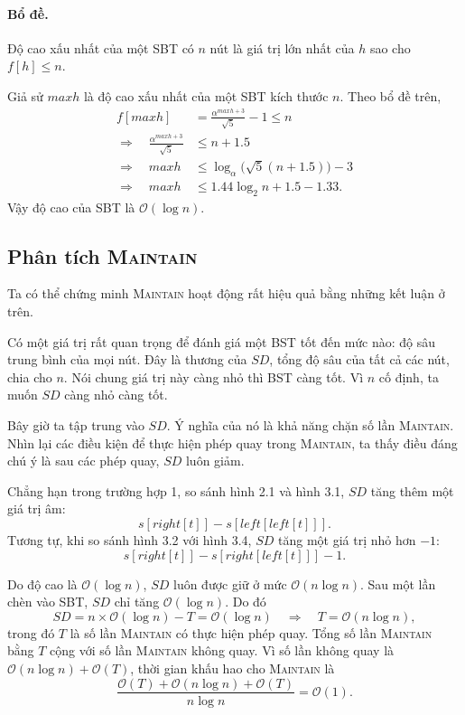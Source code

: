 \documentclass[11pt]{article}
\newcommand{\Oh}{\mathcal{O}}
\begin{document}
\paragraph{Bổ đề.}
Độ cao xấu nhất của một SBT có $n$ nút là giá trị lớn nhất của $h$ sao cho
$f[h]\le n$.

Giả sử $\mathit{maxh}$ là độ cao xấu nhất của một SBT kích thước $n$. Theo bổ
đề trên,
\[
\begin{aligned}
f[\mathit{maxh}]&=\frac{\alpha^{\mathit{maxh}+3}}{\sqrt{5}}-1\le n\\
\Rightarrow\quad
\frac{\alpha^{\mathit{maxh}+3}}{\sqrt{5}}&\le n+1.5\\
\Rightarrow\quad
\mathit{maxh}&\le \log_{\alpha}\bigl(\sqrt{5}(n+1.5)\bigr)-3\\
\Rightarrow\quad
\mathit{maxh}&\le 1.44\log_2 n+1.5-1.33.
\end{aligned}
\]
Vậy độ cao của SBT là $\Oh(\log n)$.

\subsection{Phân tích \textsc{Maintain}}

Ta có thể chứng minh \textsc{Maintain} hoạt động rất hiệu quả bằng những kết
luận ở trên.

Có một giá trị rất quan trọng để đánh giá một BST tốt đến mức nào: độ sâu
trung bình của mọi nút. Đây là thương của $SD$, tổng độ sâu của tất cả các
nút, chia cho $n$. Nói chung giá trị này càng nhỏ thì BST càng tốt. Vì $n$ cố
định, ta muốn $SD$ càng nhỏ càng tốt.

Bây giờ ta tập trung vào $SD$. Ý nghĩa của nó là khả năng chặn số lần
\textsc{Maintain}. Nhìn lại các điều kiện để thực hiện phép quay trong
\textsc{Maintain}, ta thấy điều đáng chú ý là sau các phép quay, $SD$ luôn
giảm.

Chẳng hạn trong trường hợp 1, so sánh hình 2.1 và hình 3.1, $SD$ tăng thêm
một giá trị âm:
\[
  s[\mathit{right}[t]]-s[\mathit{left}[\mathit{left}[t]]].
\]
Tương tự, khi so sánh hình 3.2 với hình 3.4, $SD$ tăng một giá trị nhỏ hơn
$-1$:
\[
  s[\mathit{right}[t]]-s[\mathit{right}[\mathit{left}[t]]]-1.
\]

Do độ cao là $\Oh(\log n)$, $SD$ luôn được giữ ở mức $\Oh(n\log n)$. Sau một
lần chèn vào SBT, $SD$ chỉ tăng $\Oh(\log n)$. Do đó
\[
  SD=n\times \Oh(\log n)-T=\Oh(\log n)
  \quad\Rightarrow\quad
  T=\Oh(n\log n),
\]
trong đó $T$ là số lần \textsc{Maintain} có thực hiện phép quay. Tổng số lần
\textsc{Maintain} bằng $T$ cộng với số lần \textsc{Maintain} không quay. Vì
số lần không quay là $\Oh(n\log n)+\Oh(T)$, thời gian khấu hao cho
\textsc{Maintain} là
\[
  \frac{\Oh(T)+\Oh(n\log n)+\Oh(T)}{n\log n}
  =\Oh(1).
\]
\end{document}
